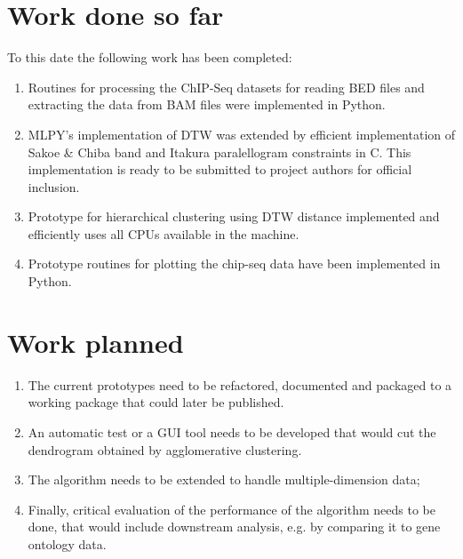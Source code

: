 \documentclass[12pt,a4paper]{article}
\begin{document}
\section{Work done so far}
To this date the following work has been completed:
\begin{enumerate}
\item Routines for processing the ChIP-Seq datasets for reading BED files and extracting the data from BAM files were implemented in Python.
\item MLPY's\cite{Albanese:2012vf} implementation of DTW was extended by efficient
    implementation of Sakoe \& Chiba band and Itakura paralellogram constraints in C.
    This implementation is ready to be submitted to project authors for official inclusion.
\item Prototype for hierarchical clustering using DTW distance implemented and efficiently uses all CPUs available in the machine.
\item Prototype routines for plotting the chip-seq data have been implemented in Python.
\end{enumerate}

\section{Work planned}
\begin{enumerate}
    \item The current prototypes need to be refactored, documented and packaged to a working package that could later be published.
    \item An automatic test or a GUI tool needs to be developed that would cut the dendrogram obtained by agglomerative clustering.
    \item The algorithm needs to be extended to handle multiple-dimension data;
    \item Finally, critical evaluation of the performance of the algorithm needs to be done, that would include downstream analysis, e.g. by comparing it to gene ontology data\cite{Botstein:2000ja}.
\end{enumerate}



\end{document}
